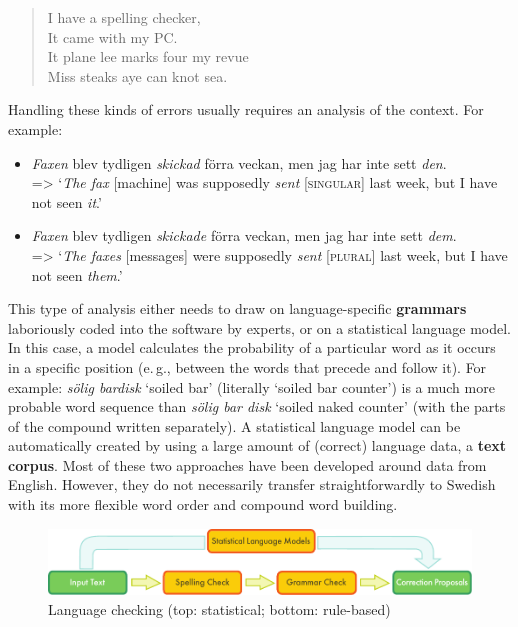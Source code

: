 \begin{multicols}{2}
\begin{quote}
  I have a spelling checker,\\
  It came with my PC.\\ 
  It plane lee marks four my revue\\
  Miss steaks aye can knot sea.
\end{quote}

Handling these kinds of errors usually requires an analysis of the context. For example: 

\begin{itemize}
\item \textit{Faxen} blev tydligen \textit{skickad} förra veckan, men jag har inte sett \textit{den}.\\
=> ‘\emph{The fax} [machine] was supposedly \emph{sent} [\textsc{singular}] last week, but I have not seen \emph{it}.’
\item \textit{Faxen} blev tydligen \textit{skickade} förra veckan, men jag har inte sett \textit{dem}.\\
=> ‘\emph{The faxes} [messages] were supposedly \emph{sent} [\textsc{plural}] last week, but I have not seen \emph{them}.’
\end{itemize}

This type of analysis either needs to draw on language-specific
\textbf{grammars} laboriously coded into the software by experts, or
on a statistical language model. In this case, a model calculates the
probability of a particular word as it occurs in a specific position
(e.\,g., between the words that precede and follow it). For example:
\textit{sölig bardisk} `soiled bar' (literally `soiled bar counter')
is a much more probable word sequence than \textit{sölig bar disk}
`soiled naked counter' (with the parts of the compound written
separately). A statistical language model can be automatically created
by using a large amount of (correct) language data, a \textbf{text
  corpus}. Most of these two approaches have been developed around
data from English. However, they do not necessarily transfer
straightforwardly to Swedish with its more flexible word order and
compound word building.

\begin{figure}[htb]
  \center
  \includegraphics[width=\textwidth]{../_media/english/language_checking}
  \caption{Language checking (top: statistical; bottom: rule-based)}
  \label{fig:langcheckingaarch_en}
\end{figure}


\end{multicols}
